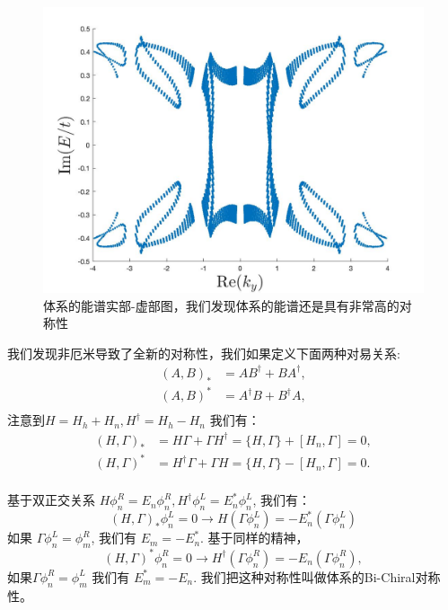 \documentclass[supercite]{HustGraduPaper}
\begin{document}
   	\begin{figure}
   		\centering
   		\includegraphics[width=1\linewidth]{Figures/topoinsu/spe_com}
   		\caption{体系的能谱实部-虚部图，我们发现体系的能谱还是具有非常高的对称性}
   		\label{fig:specom}
   	\end{figure}
   	
   	我们发现非厄米导致了全新的对称性，我们如果定义下面两种对易关系:
   	\begin{equation}
   	\begin{aligned}
   	(A,B)_{*} &= AB^\dagger + BA^\dagger, \\
   	(A,B)^{*} &= A^\dagger B + B^\dagger A, \\
   	\end{aligned}
   	\end{equation}
   	注意到$H = H_h + H_n, H^\dagger = H_h - H_n$ 我们有：
   	\begin{equation}
   	\begin{aligned}
   	(H,\Gamma)_* &= H\Gamma + \Gamma H^\dagger = \{H,\Gamma\} + [H_n, \Gamma] = 0, \\
   	(H,\Gamma)^* &= H^\dagger\Gamma + \Gamma H = \{H,\Gamma\} - [H_n, \Gamma] = 0. \\
   	\end{aligned}
   	\end{equation}
   	
   	基于双正交关系 $H \phi_n^R = E_n \phi_n^R, H^\dagger \phi_n^L = E_n^* \phi_n^L$, 我们有：
   	\begin{equation}
   	(H,\Gamma)_* \phi_n^L = 0 \to H (\Gamma \phi_n^L) = -E_n^* (\Gamma \phi_n^L)
   	\end{equation}
   	如果 $\Gamma \phi_n^L = \phi_m^R$, 我们有 $E_m = -E_n^*$. 基于同样的精神，
   	\begin{equation}
   	(H,\Gamma)^*\phi_n^R = 0 \to H^\dagger (\Gamma \phi_n^R) = -E_n (\Gamma \phi_n^R),
   	\end{equation}
   	如果$\Gamma \phi_n^R = \phi_m^L$ 我们有 $E_m^* = -E_n$. 我们把这种对称性叫做体系的Bi-Chiral对称性。
   	
\end{document}
